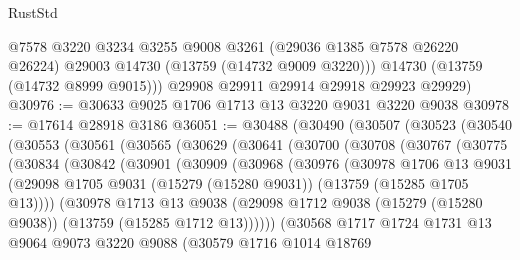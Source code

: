 \begin{lexlean}{RustStd}
\begin{coremodule}
          @7578
          @3220
          @3234
          @3255
          @9008
          @3261
          (@29036 @1385 @7578 @26220 @26224)
          @29003
          @14730
          (@13759 (@14732 @9009 @3220)))
        @14730
        (@13759 (@14732 @8999 @9015)))
      @29908
      @29911
      @29914
      @29918
      @29923
      @29929)
@30976 := @30633 @9025 @1706 @1713 @13 @3220 @9031 @3220 @9038
@30978 := @17614 @28918 @3186
@36051 := @30488
    (@30490
      (@30507
        (@30523
          (@30540
            (@30553
              (@30561
                (@30565
                  (@30629
                    (@30641
                      (@30700
                        (@30708
                          (@30767
                            (@30775
                              (@30834
                                (@30842
                                  (@30901
                                    (@30909
                                      (@30968
                                        (@30976
                                          (@30978
                                            @1706
                                            @13
                                            @9031
                                            (@29098
                                              @1705
                                              @9031
                                              (@15279 (@15280 @9031))
                                              (@13759 (@15285 @1705 @13))))
                                          (@30978
                                            @1713
                                            @13
                                            @9038
                                            (@29098
                                              @1712
                                              @9038
                                              (@15279 (@15280 @9038))
                                              (@13759 (@15285 @1712 @13))))))
                                      (@30568
                                        @1717
                                        @1724
                                        @1731
                                        @13
                                        @9064
                                        @9073
                                        @3220
                                        @9088
                                        (@30579
                                          @1716
                                          @1014
                                          @18769

\end{coremodule}
\end{lexlean}
